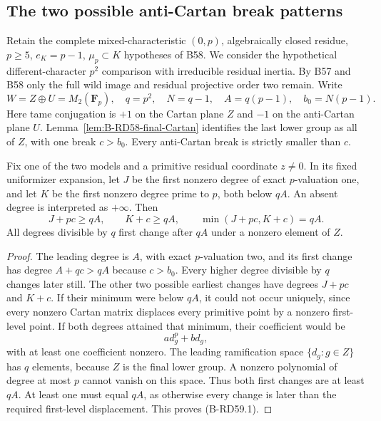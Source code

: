 \subsection{The two possible anti-Cartan break patterns}

Retain the complete mixed-characteristic $(0,p)$, algebraically closed
residue, $p\ge5$, $e_K=p-1$, $\mu_p\subset K$ hypotheses of B58.
We consider the hypothetical different-character $p^2$ comparison
with irreducible residual inertia. By B57 and B58 only the full
wild image and residual projective order two remain. Write
\[
 W=Z\oplus U=M_2(\mathbf F_p),\quad q=p^2,\quad N=q-1,
 \quad A=q(p-1),\quad b_0=N(p-1).
\]
Here tame conjugation is $+1$ on the Cartan plane $Z$ and $-1$ on
the anti-Cartan plane $U$. Lemma~\ref{lem:B-RD58-final-Cartan}
identifies the last lower group as all of $Z$, with one break
$c>b_0$. Every anti-Cartan break is strictly smaller than $c$.

\begin{lemma}
\label{lem:B-RD59-final-bound}
Fix one of the two models and a primitive residual coordinate
$z\ne0$. In its fixed uniformizer expansion, let $J$ be the first
nonzero degree of exact $p$-valuation one, and let $K$ be the first
nonzero degree prime to $p$, both below $qA$. An absent degree is
interpreted as $+\infty$. Then
\[
          J+pc\ge qA,\qquad K+c\ge qA,\qquad
                       \min(J+pc,K+c)=qA.              \tag{B-RD59.1}
\]
All degrees divisible by $q$ first change after $qA$ under a
nonzero element of $Z$.
\end{lemma}
\begin{proof}
The leading degree is $A$, with exact $p$-valuation two, and its
first change has degree $A+qc>qA$ because $c>b_0$.
Every higher degree divisible by $q$ changes later still.
The other two possible earliest changes have degrees $J+pc$ and
$K+c$. If their minimum were below $qA$, it could not occur
uniquely, since every nonzero Cartan matrix displaces every primitive
point by a nonzero first-level point. If both degrees attained that
minimum, their coefficient would be
\[
                           a d_g^p+b d_g,
\]
with at least one coefficient nonzero. The leading ramification
space $\{d_g:g\in Z\}$ has $q$ elements, because $Z$ is the final
lower group. A nonzero polynomial of degree at most $p$ cannot
vanish on this space. Thus both first changes are at least $qA$.
At least one must equal $qA$, as otherwise every change is later
than the required first-level displacement. This proves (B-RD59.1).
\end{proof}

